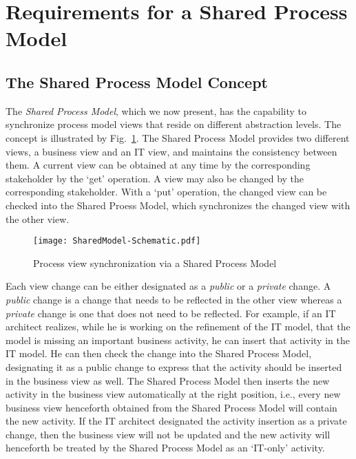 \section{Requirements for a Shared Process Model}
\label{sec:requirements}

\subsection{The Shared Process Model Concept}

The \emph{Shared Process Model}, which we now present, has the capability to synchronize process model views that reside on different abstraction levels.
The concept is illustrated by Fig.~\ref{fig:SharedModel-Concept}. The Shared Process Model provides two different views, a business view and an IT view, and maintains the consistency between them. A current view can be obtained at any time by the corresponding stakeholder by the `get' operation. A view may also be changed by the corresponding stakeholder. With a `put' operation, the changed view can be checked into the Shared Proess Model, which synchronizes the changed view with the other view.

\begin{figure}[bt]
\begin{center}
\vspace{-0.4cm}
\texttt{[image: SharedModel-Schematic.pdf]} %
\caption{Process view synchronization via a Shared Process Model}
\label{fig:SharedModel-Concept}
\vspace{-0.4cm}
\end{center}
\end{figure}

Each view change can be either designated as a \emph{public} or a \emph{private} change. A \emph{public} change is a change that needs to be reflected in the other view whereas a \emph{private} change is one that does not need to be reflected. For example, if an IT architect realizes, while he is working on the refinement of the IT model, that the model is missing an important business activity, he can insert that activity in the IT model. He can then check the change into the Shared Process Model, designating it as a public change to express that the activity should be inserted in the business view as well. The Shared Process Model then inserts the new activity in the business view automatically at the right position, i.e., every new business view henceforth obtained from the Shared Process Model will contain the new activity. If the IT architect designated the activity insertion as a private change, then the business view will not be updated and the new activity will henceforth be treated by the Shared Process Model as an `IT-only' activity.


